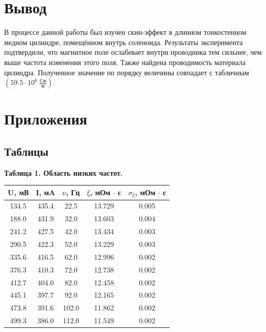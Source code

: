 \documentclass[15pt,a5paper,reqno]{article}
\begin{document}
\section{Вывод}

    В процессе данной работы был изучен скин-эффект в длинном тонкостенном медном цилиндре, помещённом внутрь соленоида. Результаты эксперимента подтвердили, что магнитное поле ослабевает внутри проводника тем сильнее, чем выше частота изменения этого поля. Также найдена проводимость материала цилиндра. Полученное значение по порядку величины совпадает с табличным $(59.5\cdot10^6\ \frac{\text{См}}{\text{м}})$.
    
\newpage
\section{Приложения}

    \subsection{Таблицы}

    \noindent\hypertarget{table_1}{\textbf{Таблица 1. Область низких частот.}}
    \begin{center}
        \begin{tabular}{|c|c|c|c|c|}
        \hline
        U, мВ & I, мA & $\nu$, Гц & $\xi$, мОм $\cdot$ с & $\sigma_{\xi}$, мОм $\cdot$ с \\ \hline\hline
        134.5 & 435.4 & 22.5      & 13.729               & 0.005                      \\ \hline
        188.0 & 431.9 & 32.0      & 13.603               & 0.004                      \\ \hline
        241.2 & 427.5 & 42.0      & 13.434               & 0.003                      \\ \hline
        290.5 & 422.3 & 52.0      & 13.229               & 0.003                      \\ \hline
        335.6 & 416.5 & 62.0      & 12.996               & 0.002                      \\ \hline
        376.3 & 410.3 & 72.0      & 12.738               & 0.002                      \\ \hline
        412.7 & 404.0 & 82.0      & 12.458               & 0.002                      \\ \hline
        445.1 & 397.7 & 92.0      & 12.165               & 0.002                      \\ \hline
        473.8 & 391.6 & 102.0     & 11.862               & 0.002                      \\ \hline
        499.3 & 386.0 & 112.0     & 11.549               & 0.002                      \\ \hline
        \end{tabular}
    \end{center}
\end{document}
